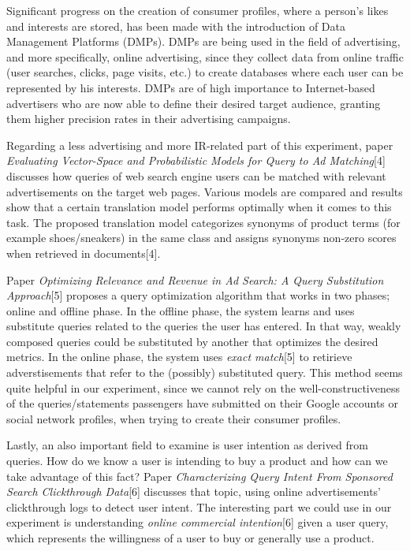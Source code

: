 \documentclass[letterpaper,11pt]{article}
\begin{document}
Significant progress on the creation of consumer profiles, where a person's likes and interests are stored, has been made with the introduction of Data Management Platforms (DMPs). DMPs are being used in the field of advertising, and more specifically, online advertising, since they collect data from online traffic (user searches, clicks, page visits, etc.) to create databases where each user can be represented by his interests. DMPs are of high importance to Internet-based advertisers who are now able to define their desired target audience, granting them higher precision rates in their advertising campaigns. 

Regarding a less advertising and more IR-related part of this experiment, paper \emph{Evaluating Vector-Space and Probabilistic Models for Query to Ad Matching}[4] discusses how queries of web search engine users can be matched with relevant advertisements on the target web pages. Various models are compared and results show that a certain translation model performs optimally when it comes to this task. The proposed translation model categorizes synonyms of product terms (for example shoes/sneakers) in the same class and assigns synonyms non-zero scores when retrieved in documents[4]. 

Paper \emph{Optimizing Relevance and Revenue in Ad Search: A Query Substitution Approach}[5] proposes a query optimization algorithm that works in two phases; online and offline phase. In the offline phase, the system learns and uses substitute queries related to the queries the user has entered. In that way, weakly composed queries could be substituted by another that optimizes the desired metrics. In the online phase, the system uses \emph{exact match}[5] to retirieve adverstisements that refer to the (possibly) substituted query. This method seems quite helpful in our experiment, since we cannot rely on the well-constructiveness of the queries/statements passengers have submitted on their Google accounts or social network profiles, when trying to create their consumer profiles.

Lastly, an also important field to examine is user intention as derived from queries. How do we know a user is intending to buy a product and how can we take advantage of this fact? Paper \emph{Characterizing Query Intent From
Sponsored Search Clickthrough Data}[6] discusses that topic, using online advertisements' clickthrough logs to detect user intent. The interesting part we could use in our experiment is understanding \emph{online commercial intention}[6] given a user query, which represents the willingness of a user to buy or generally use a product.
\end{document}
